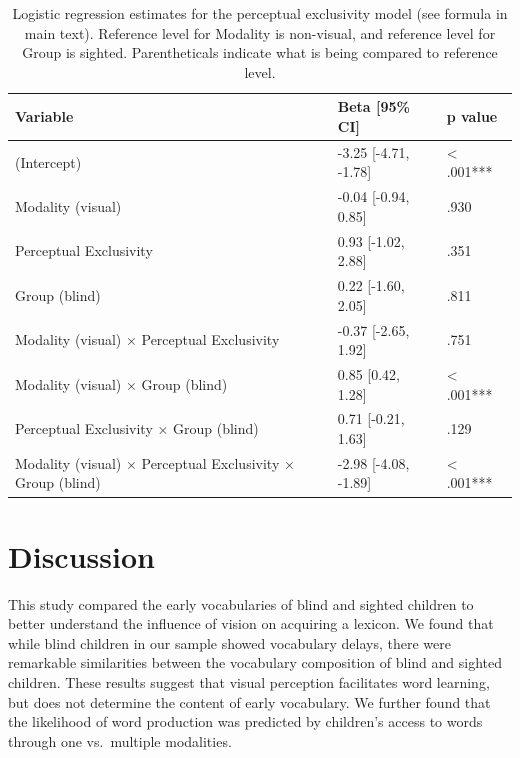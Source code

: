 \documentclass[
  man,floatsintext]{apa6}
\begin{document}
\begin{table}[H]

\caption{\label{tab:excl-table}Logistic regression estimates for the perceptual exclusivity model (see formula in main text). Reference level for Modality is non-visual, and reference level for Group is sighted. Parentheticals indicate what is being compared to reference level.}
\centering
\begin{tabular}[t]{l|l|l}
\hline
Variable & Beta [95\% CI] & p value\\
\hline
(Intercept) & -3.25 [-4.71, -1.78] & < .001***\\
\hline
Modality (visual) & -0.04 [-0.94, 0.85] & .930\\
\hline
Perceptual Exclusivity & 0.93 [-1.02, 2.88] & .351\\
\hline
Group (blind) & 0.22 [-1.60, 2.05] & .811\\
\hline
Modality (visual) × Perceptual Exclusivity & -0.37 [-2.65, 1.92] & .751\\
\hline
Modality (visual) × Group (blind) & 0.85 [0.42, 1.28] & < .001***\\
\hline
Perceptual Exclusivity × Group (blind) & 0.71 [-0.21, 1.63] & .129\\
\hline
Modality (visual) × Perceptual Exclusivity × Group (blind) & -2.98 [-4.08, -1.89] & < .001***\\
\hline
\end{tabular}
\end{table}

\hypertarget{discussion}{%
\section{Discussion}\label{discussion}}

This study compared the early vocabularies of blind and sighted children to better understand the influence of vision on acquiring a lexicon. We found that while blind children in our sample showed vocabulary delays, there were remarkable similarities between the vocabulary composition of blind and sighted children. These results suggest that visual perception facilitates word learning, but does not determine the content of early vocabulary. We further found that the likelihood of word production was predicted by children's access to words through one vs.~multiple modalities.
\end{document}
